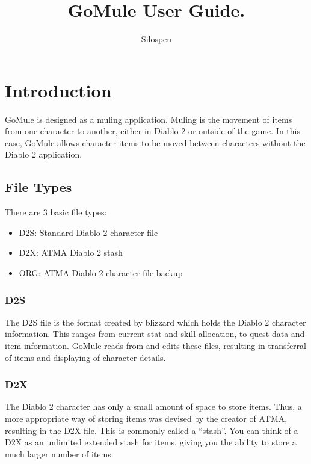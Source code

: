 \documentclass[a4paper,10pt]{article}
\title{GoMule User Guide.}
\author{Silospen}
\begin{document}
\maketitle
\clearpage
\tableofcontents
\clearpage

\section{Introduction}

GoMule is designed as a muling application. Muling is the movement of items from one character to another, either in Diablo 2 or outside of the game. In this case, GoMule allows character items to be moved between characters without the Diablo 2 application.

\subsection{File Types}

There are 3 basic file types:

\begin{itemize}
 \item D2S: Standard Diablo 2 character file
 \item D2X: ATMA Diablo 2 stash
 \item ORG: ATMA Diablo 2 character file backup
\end{itemize}

\subsubsection{D2S}

The D2S file is the format created by blizzard which holds the Diablo 2 character information. This ranges from current stat and skill allocation, to quest data and item information. GoMule reads from and edits these files, resulting in transferral of items and displaying of character details.

\subsubsection{D2X}

The Diablo 2 character has only a small amount of space to store items. Thus, a more appropriate way of storing items was devised by the creator of ATMA, resulting in the D2X file. This is commonly called a ``stash''. You can think of a D2X as an unlimited extended stash for items, giving you the ability to store a much larger number of items.
\end{document}

